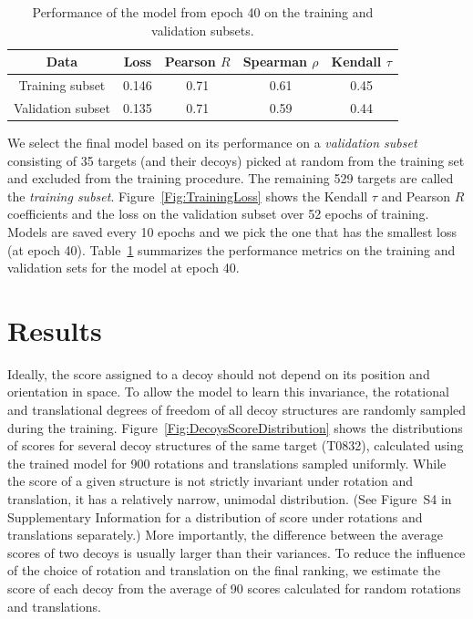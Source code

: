 \documentclass{bioinfo}
\begin{document}
\begin{table}[!t]
  \centering
  \caption {Performance of the model from epoch 40 on the training and
    validation subsets.}
\begin{tabular}{ c c c c c }
    Data & Loss & Pearson $R$ & Spearman $\rho$ & Kendall $\tau$ \\
    \hline
    Training subset     &0.146 &0.71 &0.61 &0.45 \\
    Validation subset   &0.135 &0.71 &0.59 &0.44 \\ \hline
\end{tabular}
\label{Tbl:TrainingResults}
\end{table}

We select the final model based on its performance on a
\emph{validation subset} consisting of 35 targets (and their decoys)
picked at random from the training set and excluded from the training
procedure. The remaining 529 targets are called the \emph{training
subset}.  Figure~\ref{Fig:TrainingLoss} shows the Kendall $\tau$ and
Pearson $R$ coefficients and the loss on the validation subset over 52
epochs of training.  Models are saved every 10 epochs and we pick the
one that has the smallest loss (at epoch 40).
Table~\ref{Tbl:TrainingResults} summarizes the performance metrics on
the training and validation sets for the model at epoch 40.


\section{Results}

Ideally, the score assigned to a decoy should not depend on its
position and orientation in space.  To allow the model to learn this
invariance, the rotational and translational degrees of freedom of all
decoy structures are randomly sampled during the training.
Figure~\ref{Fig:DecoysScoreDistribution} shows the distributions of
scores for several decoy structures of the same target (T0832),
calculated using the trained model for 900 rotations and translations
sampled uniformly.  While the score of a given structure is not
strictly invariant under rotation and translation, it has a relatively
narrow, unimodal distribution.  (See Figure~S4 in Supplementary
Information for a distribution of score under rotations and
translations separately.)  More importantly, the difference between
the average scores of two decoys is usually larger than their
variances.
To reduce the influence of the choice of rotation and translation on
the final ranking, we estimate the score of each decoy from the
average of 90 scores calculated for random rotations and translations.
\end{document}
